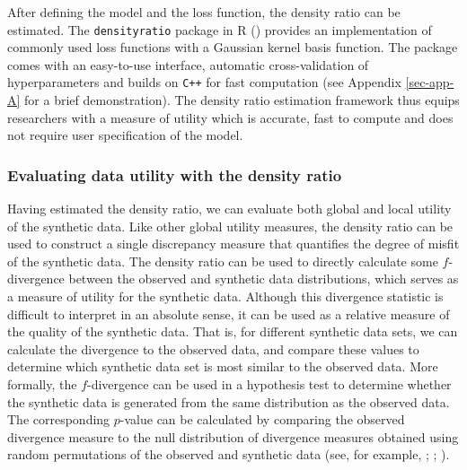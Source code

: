 \documentclass[
]{article}
\begin{document}
After defining the model and the loss function, the density ratio can be
estimated. The \texttt{densityratio} package in R
() provides an implementation of
commonly used loss functions with a Gaussian kernel basis function. The
package comes with an easy-to-use interface, automatic cross-validation
of hyperparameters and builds on \texttt{C++} for fast computation (see
Appendix \ref{sec-app-A} for a brief demonstration). The density ratio
estimation framework thus equips researchers with a measure of utility
which is accurate, fast to compute and does not require user
specification of the model.

\subsubsection{Evaluating data utility with the density
ratio}\label{evaluating-data-utility-with-the-density-ratio}

Having estimated the density ratio, we can evaluate both global and
local utility of the synthetic data. Like other global utility measures,
the density ratio can be used to construct a single discrepancy measure
that quantifies the degree of misfit of the synthetic data. The density
ratio can be used to directly calculate some \(f\)-divergence between
the observed and synthetic data distributions, which serves as a measure
of utility for the synthetic data. Although this divergence statistic is
difficult to interpret in an absolute sense, it can be used as a
relative measure of the quality of the synthetic data. That is, for
different synthetic data sets, we can calculate the divergence to the
observed data, and compare these values to determine which synthetic
data set is most similar to the observed data. More formally, the
\(f\)-divergence can be used in a hypothesis test to determine whether
the synthetic data is generated from the same distribution as the
observed data. The corresponding \(p\)-value can be calculated by
comparing the observed divergence measure to the null distribution of
divergence measures obtained using random permutations of the observed
and synthetic data (see, for example,
;
;
).
\end{document}

